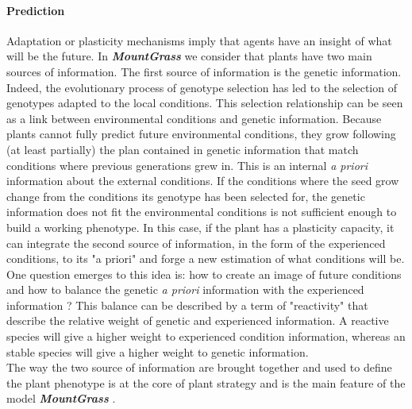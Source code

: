 \documentclass[a4paper,twoside, justified,marginals=raggedright, nobib]{tufte-handout}
\newcommand{\model}{\textit{\textbf{MountGrass }}}
\begin{document}
\paragraph{Prediction} Adaptation or plasticity mechanisms imply that agents have an insight of what will be the future. In \model we consider that plants have two main sources of information. The first source of information is the genetic information. Indeed, the evolutionary process of genotype selection has led to the selection of genotypes adapted to the local conditions. This selection relationship can be seen as a link between environmental conditions and genetic information. Because plants cannot fully predict future environmental conditions, they grow following (at least partially) the plan contained in genetic information that match conditions where previous generations grew in.  This is an internal \textit{a priori} information about the external conditions. If the conditions where the seed grow change from the conditions its genotype has been selected for, the genetic information does not fit the environmental conditions is not sufficient enough to build a working phenotype. In this case, if the plant has a plasticity capacity, it can integrate the second source of information, in the form of the experienced conditions, to its "a priori" and forge a new estimation of what conditions will be. One question emerges to this idea is: how to create an image of future conditions and how to balance the genetic \textit{a priori} information with the experienced information ? This balance can be described by a term of "reactivity" that describe the relative weight of genetic and experienced information. A reactive species will give a higher weight to experienced condition information, whereas an stable species will give a higher weight to genetic information.\\
\indent The way the two source of information are brought together and used to define the plant phenotype is at the core of plant strategy and is the main feature of the model \model.

\end{document}
